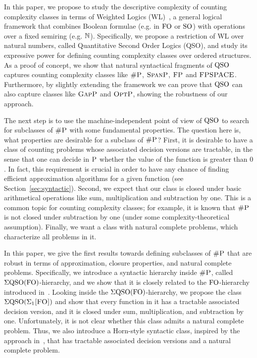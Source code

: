 In this paper, we propose to study the descriptive complexity of counting complexity classes in terms of Weighted Logics (WL)~\cite{DrosteG07}, a general logical framework that combines Boolean formulae (e.g. in ${\rm FO}$ or ${\rm SO}$) with operations over a fixed semiring (e.g. $\mathbb{N}$). 
Specifically, we propose a restriction of WL over natural numbers, called Quantitative Second Order Logics (QSO), and study its expressive power for defining counting complexity classes over ordered structures. 
As a proof of concept, we show that natural syntactical fragments of ${\rm QSO}$ captures counting complexity classes like $\text{\sc \#P}$, $\text{\sc SpanP}$, $\text{\sc FP}$ and $\text{\sc FPSPACE}$.
Furthermore, by slightly extending the framework we can prove that ${\rm QSO}$ can also capture classes like $\text{\sc GapP}$ and $\text{\sc OptP}$, showing the robustness of our approach.

The next step is to use the machine-independent point of view of ${\rm QSO}$ to search for subclasses of $\text{\sc \#P}$ with some fundamental properties.
The question here is, what properties are desirable for a subclass of $\text{\sc \#P}$?
First, it is desirable to have a class of counting problems whose associated decision versions are tractable, in the sense that one can decide in $\text{\sc P}$ whether the value of the function is greater than $0$. 
In fact, this requirement is crucial in order to have any chance of finding efficient approximation algorithms for a given function (see Section~\ref{sec:syntactic}).
Second, we expect that our class is closed under basic arithmetical operations like sum, multiplication and subtraction by one. 
This is a common topic for counting complexity classes; for example, it is known that $\text{\sc \#P}$ is not closed under subtraction by one (under some complexity-theoretical assumption). 
Finally, we want a class with natural complete problems, which characterize all problems in it.

In this paper, we give the first results towards defining subclasses of $\text{\sc \#P}$ that are robust in terms of approximation, closure properties, and natural complete problems. 
Specifically, we introduce a syntactic hierarchy inside $\text{\sc \#P}$, called $\Sigma{\rm QSO}({\rm FO})$-hierarchy, and we show that it is closely related to the ${\rm FO}$-hierarchy introduced in~\cite{SalujaST95}. 
Looking inside the $\Sigma{\rm QSO}({\rm FO})$-hierarchy, we propose the class $\Sigma{\rm QSO}(\Sigma_{1}\textsc{[FO]})$ and show that every function in it has a tractable associated decision version, and it is closed under sum, multiplication, and subtraction by one.
Unfortunately, it is not clear whether this class admits 
a natural complete problem.
Thus, 
we also introduce a Horn-style syntactic class, inspired by the approach in~\cite{G92}, that has tractable associated decision versions and a natural complete problem.

